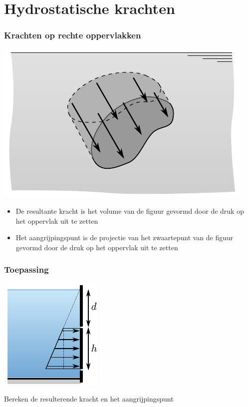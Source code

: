 \documentclass[t]{beamer}
\begin{document}
  	\section{Hydrostatische krachten}		
		\begin{frame}
			\frametitle{Krachten op rechte oppervlakken}
			\center
			\includegraphics[scale=0.9]{../fig/hydrostatica/grafische_weergave_integraal}
			\begin{itemize}
				\pause
				\item De resultante kracht is het volume van de figuur gevormd door de druk op het oppervlak uit te zetten
				\pause
				\item Het aangrijpingspunt is de projectie van het zwaartepunt van de figuur gevormd door de druk op het oppervlak uit te zetten
			\end{itemize}
  		\end{frame}
  		\begin{frame}
			\frametitle{Toepassing}
			\vspace{1cm}
			\center
			\includegraphics{../fig/hydrostatica/kracht_op_luik}
			
			Bereken de resulterende kracht en het aangrijpingspunt
		\end{frame}
\end{document}
